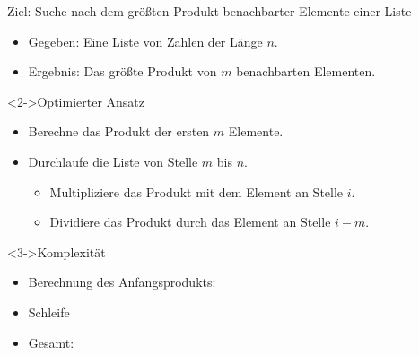\begin{frame}
    \begin{block}{Ziel: Suche nach dem größten Produkt benachbarter Elemente einer Liste}
        \begin{itemize}
            \item Gegeben: Eine Liste von Zahlen der Länge $n$.
            \item Ergebnis: Das größte Produkt von $m$ benachbarten Elementen.
        \end{itemize}
    \end{block}
    \begin{block}<2->{Optimierter Ansatz}
        \begin{itemize}
            \item Berechne das Produkt der ersten $m$ Elemente.
            \item Durchlaufe die Liste von Stelle $m$ bis $n$.
            \begin{itemize}
                \item Multipliziere das Produkt mit dem Element an Stelle $i$.
                \item Dividiere das Produkt durch das Element an Stelle $i-m$.
            \end{itemize}
        \end{itemize}
    \end{block}
    \begin{block}<3->{Komplexität}
        \begin{itemize}
            \item Berechnung des Anfangsprodukts: \olin[m]
            \item Schleife \olin[n-m]
            \item \alert{Gesamt: \olin}
        \end{itemize}
    \end{block}
\end{frame}
